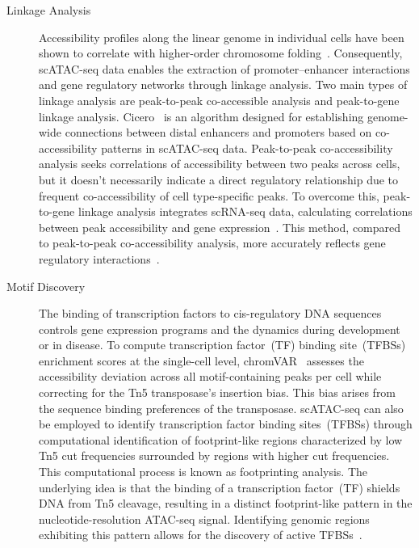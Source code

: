 \begin{description}
	\item[Linkage Analysis]
	Accessibility profiles along the linear genome in individual cells have been shown to correlate with higher-order chromosome folding~\citep{Buenrostro2015}. Consequently, scATAC-seq data enables the extraction of promoter–enhancer interactions and gene regulatory networks through linkage analysis. Two main types of linkage analysis are peak-to-peak co-accessible analysis and peak-to-gene linkage analysis. Cicero~\citep{pliner2018cicero} is an algorithm designed for establishing genome-wide connections between distal enhancers and promoters based on co-accessibility patterns in scATAC-seq data. Peak-to-peak co-accessibility analysis seeks correlations of accessibility between two peaks across cells, but it doesn't necessarily indicate a direct regulatory relationship due to frequent co-accessibility of cell type-specific peaks. To overcome this, peak-to-gene linkage analysis integrates scRNA-seq data, calculating correlations between peak accessibility and gene expression~\citep{Granja2021}. This method, compared to peak-to-peak co-accessibility analysis, more accurately reflects gene regulatory interactions~\citep{shi2022scatacoverview}.

	\item[Motif Discovery]
	The binding of transcription factors to cis-regulatory DNA sequences controls gene expression programs and the dynamics during development or in disease. To compute transcription factor~(TF) binding site~(TFBSs) enrichment scores at the single-cell level, chromVAR~\citep{schep2017chromvar} assesses the accessibility deviation across all motif-containing peaks per cell while correcting for the Tn5 transposase's insertion bias. This bias arises from the sequence binding preferences of the transposase. scATAC-seq can also be employed to identify transcription factor binding sites~(TFBSs) through computational identification of footprint-like regions characterized by low Tn5 cut frequencies surrounded by regions with higher cut frequencies. This computational process is known as footprinting analysis. The underlying idea is that the binding of a transcription factor~(TF) shields DNA from Tn5 cleavage, resulting in a distinct footprint-like pattern in the nucleotide-resolution ATAC-seq signal. Identifying genomic regions exhibiting this pattern allows for the discovery of active TFBSs~\citep{li2019hintatac}.

\end{description}

